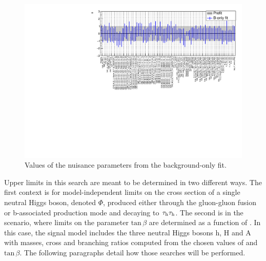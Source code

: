 \begin{figure}
    \centering
    \includegraphics[width=\textwidth]{Images/nuisances.pdf}
    \caption{Values of the nuisance parameters from the background-only fit.}
    \label{fig:nuisances}
\end{figure}


Upper limits in this search are meant to be determined in two different ways. The first context is for model-independent limits on the cross section of a single neutral Higgs boson, denoted $\Phi$, produced either through the gluon-gluon fusion or b-associated production mode and decaying to $\tau_{\rm h}\tau_{\rm h}$. The second is in the \mhmax scenario, where limits on the parameter  $\mathrm{tan}\,\beta$ are determined as a function of \ma. In this case, the signal model includes the three neutral Higgs bosons h, H and A with masses, cross and branching ratios computed from the chosen values of \ma and $\mathrm{tan}\,\beta$. The following paragraphs detail how those searches will be performed.


